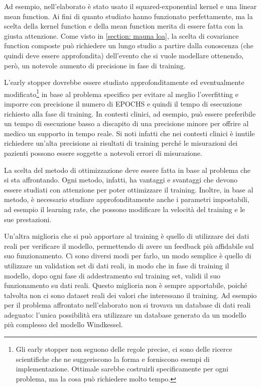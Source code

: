 Ad esempio, nell'elaborato è stato usato il squared-exponential kernel e una linear mean function. Ai fini di quanto studiato hanno funzionato perfettamente, ma la scelta della kernel function e della mean function merita di essere fatta con la giusta attenzione. Come visto in \ref{section: mauna loa}, la scelta di covariance function composte può richiedere un lungo studio a partire dalla conoscenza (che quindi deve essere approfondita) dell'evento che si vuole modellare ottenendo, però, un notevole aumento di precisione in fase di training.

L'early stopper dovrebbe essere studiato approfonditamente ed eventualmente modificato\footnote{Gli early stopper non seguono delle regole precise, ci sono delle ricerce scientifiche che ne suggeriscono la forma e forniscono esempi di implementazione. Ottimale sarebbe costruirli specificamente per ogni problema, ma la cosa può richiedere molto tempo.} in base al problema specifico per evitare al meglio l'overfitting e imporre con precisione il numero di EPOCHS e quindi il tempo di esecuzione richiesto alla fase di training. In contesti clinici, ad esempio, può essere preferibile un tempo di esecuzione basso a discapito di una precisione minore per offrire al medico un supporto in tempo reale. Si noti infatti che nei contesti clinici è inutile richiedere un'alta precisione ai risultati di training perché le misurazioni dei pazienti possono essere soggette a notevoli errori di misurazione.

La scelta del metodo di ottimizzazione deve essere fatta in base al problema che si sta affrontando. Ogni metodo, infatti, ha vantaggi e svantaggi che devono essere studiati con attenzione per poter ottimizzare il training. Inoltre, in base al metodo, è necessario studiare approfonditamente anche i parametri impostabili, ad esempio il learning rate, che possono modificare la velocità del training e le sue prestazioni.


Un'altra miglioria che si può apportare al training è quello di utilizzare dei dati reali per verificare il modello, permettendo di avere un feedback più affidabile sul suo funzionamento. Ci sono diversi modi per farlo, un modo semplice è quello di utilizzare un validation set di dati reali, in modo che in fase di training il modello, dopo ogni fase di addestramento sul training set, validi il suo funzionamento su dati reali. Questo miglioria non è sempre apportabile, poiché talvolta non ci sono dataset reali dei valori che interessano il training. Ad esempio per il problema affrontato nell'elaborato non si trovava un database di dati reali adeguato: l'unica possibilità era utilizzare un database generato da un modello più complesso del modello Windkessel.

